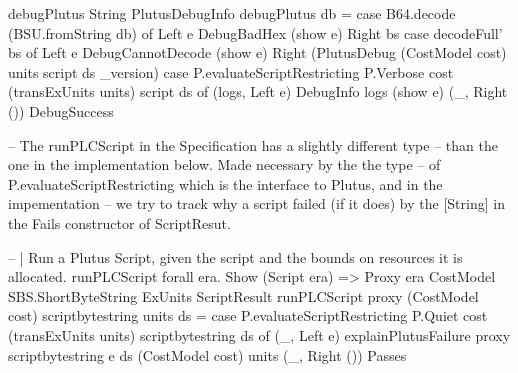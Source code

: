 debugPlutus \in String \to PlutusDebugInfo
debugPlutus db =
  case B64.decode (BSU.fromString db) of
    Left e \to DebugBadHex (show e)
    Right bs \to
      case decodeFull' bs of
        Left e \to DebugCannotDecode (show e)
        Right (PlutusDebug (CostModel cost) units script ds _version) \to
          case P.evaluateScriptRestricting
            P.Verbose
            cost
            (transExUnits units)
            script
            ds of
            (logs, Left e) \to DebugInfo logs (show e)
            (_, Right ()) \to DebugSuccess

-- The runPLCScript in the Specification has a slightly different type
-- than the one in the implementation below. Made necessary by the the type
-- of P.evaluateScriptRestricting which is the interface to Plutus, and in the impementation
-- we try to track why a script failed (if it does) by the [String] in the Fails constructor of ScriptResut.

-- | Run a Plutus Script, given the script and the bounds on resources it is allocated.
runPLCScript \in
  forall era.
  Show (Script era) =>
  Proxy era \to
  CostModel \to
  SBS.ShortByteString \to
  ExUnits \to
  [P.Data] \to
  ScriptResult
runPLCScript proxy (CostModel cost) scriptbytestring units ds =
  case P.evaluateScriptRestricting
    P.Quiet
    cost
    (transExUnits units)
    scriptbytestring
    ds of
    (_, Left e) \to explainPlutusFailure proxy scriptbytestring e ds (CostModel cost) units
    (_, Right ()) \to Passes

